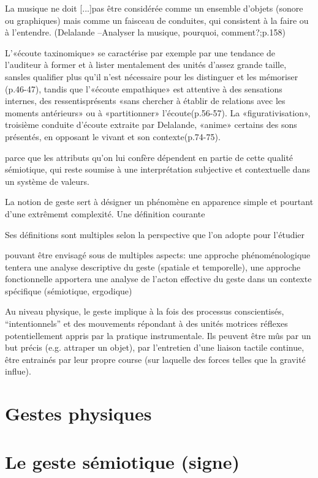 La musique ne doit [...]pas être considérée comme un ensemble d’objets (sonore ou graphiques) mais comme un faisceau de conduites, qui consistent à la faire ou à l’entendre. (Delalande –Analyser la musique, pourquoi, comment?;p.158) 
 
L’«écoute taxinomique» se caractérise par exemple par une tendance de l’auditeur à former et à lister mentalement des unités d’assez grande taille, sansles qualifier plus qu’il n’est nécessaire pour les distinguer et les mémoriser (p.46-47), tandis que l’«écoute empathique» est attentive à des sensations internes, des ressentisprésents «sans chercher à  établir de relations avec les moments antérieurs» ou à «partitionner» l’écoute(p.56-57). La «figurativisation», troisième conduite d’écoute extraite par Delalande, «anime» certains des sons présentés, en opposant le vivant et son contexte(p.74-75).

parce que les attributs qu'on lui confère dépendent en partie de cette qualité sémiotique, qui reste soumise à une interprétation subjective et contextuelle dans un système de valeurs.

La notion de geste sert à désigner un phénomène en apparence simple et pourtant d'une extrêmemt complexité. Une définition courante 

Ses définitions sont multiples selon la perspective que l'on adopte pour l'étudier

pouvant être envisagé sous de multiples aspects: une approche phénoménologique tentera une analyse descriptive du geste (spatiale et temporelle), une approche fonctionnelle apportera une analyse de l'acton effective du geste dans un contexte spécifique (sémiotique, ergodique)

Au niveau physique, le geste implique à la fois des processus conscientisés, ``intentionnels'' et des mouvements répondant à des unités motrices réflexes potentiellement appris par la pratique instrumentale. Ils peuvent être mûs par un but précis (e.g. attraper un objet), par l'entretien d'une liaison tactile continue, être entrainés par leur propre course (sur laquelle des forces telles que la gravité influe).

\section{Gestes physiques}
\section{Le geste sémiotique (signe)}
